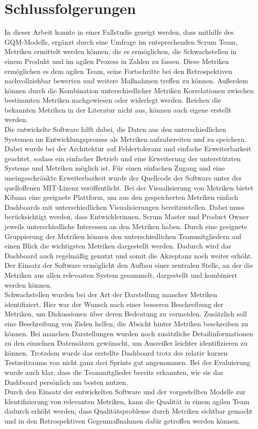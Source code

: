 \chapter{Schlussfolgerungen}

In dieser Arbeit konnte in einer Fallstudie gezeigt werden, dass mithilfe des \ac{GQM}-Modells, ergänzt durch eine Umfrage im entsprechenden Scrum Team, Metriken ermittelt werden können, die es ermöglichen, die Schwachstellen in einem Produkt und im agilen Prozess in Zahlen zu fassen.
Diese Metriken ermöglichen es dem agilen Team, seine Fortschritte bei den Retrospektiven nachvollziehbar bewerten und weitere Maßnahmen treffen zu können.
Außerdem können durch die Kombination unterschiedlicher Metriken Korrelationen zwischen bestimmten Metriken nachgewiesen oder widerlegt werden.
Reichen die bekannten Metriken in der Literatur nicht aus, können auch eigene erstellt werden.
\\
Die entwickelte Software hilft dabei, die Daten aus den unterschiedlichen Systemen im Entwicklungsprozess als Metriken aufzubereiten und zu speichern.
Dabei wurde bei der Architektur auf Fehlertoleranz und einfache Erweiterbarkeit geachtet, sodass ein einfacher Betrieb und eine Erweiterung der unterstützten Systeme und Metriken möglich ist.
Für einen einfachen Zugang und eine uneingeschränkte Erweiterbarkeit wurde der Quellcode der Software unter der quelloffenen MIT-Lizenz veröffentlicht.
Bei der Visualisierung von Metriken bietet Kibana eine geeignete Plattform, um aus den gespeicherten Metriken einfach Dashboards mit unterschiedlichen Visualisierungen bereitzustellen.
Dabei muss berücksichtigt werden, dass Entwicklerinnen, Scrum Master und Product Owner jeweils unterschiedliche Interessen an den Metriken haben.
Durch eine geeignete Gruppierung der Metriken können den unterschiedlichen Teammitgliedern auf einen Blick die wichtigsten Metriken dargestellt werden.
Dadurch wird das Dashboard auch regelmäßig genutzt und somit die Akzeptanz noch weiter erhöht.
Der Einsatz der Software ermöglicht den Aufbau einer zentralen Stelle, an der die Metriken aus allen relevanten System gesammelt, dargestellt und kombiniert werden können.
\\
Schwachstellen wurden bei der Art der Darstellung mancher Metriken identifiziert.
Hier war der Wunsch nach einer besseren Beschreibung der Metriken, um Diskussionen über deren Bedeutung zu vermeiden.
Zusätzlich soll eine Beschreibung von Zielen helfen, die Absicht hinter Metriken beschreiben zu können.
Bei manchen Darstellungen wurden noch zusätzliche Detailinformationen zu den einzelnen Datensätzen gewünscht, um Ausreißer leichter identifizieren zu können.
Trotzdem wurde das erstellte Dashboard trotz des relativ kurzen Testzeitraums von nicht ganz drei Sprints gut angenommen.
Bei der Evaluierung wurde auch klar, dass die Teammitglieder bereits erkannten, wie sie das Dashboard persönlich am besten nutzen.
\\
Durch den Einsatz der entwickelten Software und der vorgestellten Modelle zur Identifizierung von relevanten Metriken, kann die Qualität in einem agilen Team dadurch erhöht werden, dass Qualitätsprobleme durch Metriken sichtbar gemacht und in den Retrospektiven Gegenmaßnahmen dafür getroffen werden können.
